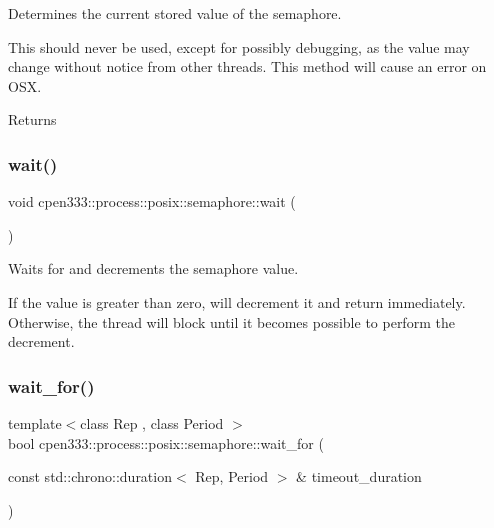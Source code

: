 Determines the current stored value of the semaphore. 

This should never be used, except for possibly debugging, as the value may change without notice from other threads. This method will cause an error on O\+SX.

\begin{DoxyReturn}{Returns}

\end{DoxyReturn}
\mbox{\label{classcpen333_1_1process_1_1posix_1_1semaphore_a1cf2d5f5922ab6358061dd3ac7121cf9}} 
\subsubsection{\texorpdfstring{wait()}{wait()}}
{\footnotesize\ttfamily void cpen333\+::process\+::posix\+::semaphore\+::wait (\begin{DoxyParamCaption}{ }\end{DoxyParamCaption})\hspace{0.3cm}{\ttfamily [inline]}}



Waits for and decrements the semaphore value. 

If the value is greater than zero, will decrement it and return immediately. Otherwise, the thread will block until it becomes possible to perform the decrement. \mbox{\label{classcpen333_1_1process_1_1posix_1_1semaphore_a8015c878067c3d93748d03c58bb1b233}} 
\subsubsection{\texorpdfstring{wait\+\_\+for()}{wait\_for()}}
{\footnotesize\ttfamily template$<$class Rep , class Period $>$ \\
bool cpen333\+::process\+::posix\+::semaphore\+::wait\+\_\+for (\begin{DoxyParamCaption}\item[{const std\+::chrono\+::duration$<$ Rep, Period $>$ \&}]{timeout\+\_\+duration }\end{DoxyParamCaption})\hspace{0.3cm}{\ttfamily [inline]}}



